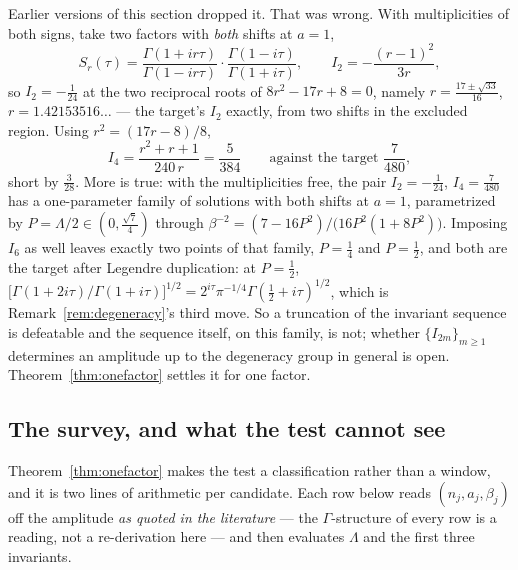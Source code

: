 \begin{remark}\label{rem:retraction}
Earlier versions of this section dropped it. That was wrong. With multiplicities
of both signs, take two factors with \emph{both} shifts at $a=1$,
\[
 S_r(\tau)=\frac{\Gamma(1+ir\tau)}{\Gamma(1-ir\tau)}\cdot
 \frac{\Gamma(1-i\tau)}{\Gamma(1+i\tau)},\qquad
 I_2=-\frac{(r-1)^2}{3r},
\]
so $I_2=-\frac1{24}$ at the two reciprocal roots of $8r^2-17r+8=0$, namely
$r=\frac{17\pm\sqrt{33}}{16}$, $r=1.42153516\ldots$ --- the target's $I_2$
exactly, from two shifts in the excluded region. Using $r^2=(17r-8)/8$,
\[
 I_4=\frac{r^2+r+1}{240\,r}=\frac5{384}
 \qquad\text{against the target }\frac7{480},
\]
short by $\frac3{28}$. More is true: with the multiplicities free, the pair
$I_2=-\frac1{24}$, $I_4=\frac7{480}$ has a one-parameter family of solutions with
both shifts at $a=1$, parametrized by $P=\Lambda/2\in(0,\frac{\sqrt7}4)$ through
$\beta^{-2}=(7-16P^2)/\big(16P^2(1+8P^2)\big)$. Imposing $I_6$ as well leaves
exactly two points of that family, $P=\frac14$ and $P=\frac12$, and both are the
target after Legendre duplication: at $P=\frac12$,
$\big[\Gamma(1+2i\tau)/\Gamma(1+i\tau)\big]^{1/2}
 =2^{i\tau}\pi^{-1/4}\Gamma(\frac12+i\tau)^{1/2}$, which is
Remark~\ref{rem:degeneracy}'s third move. So a truncation of the invariant
sequence is defeatable and the sequence itself, on this family, is not; whether
$\{I_{2m}\}_{m\geq1}$ determines an amplitude up to the degeneracy group in
general is open. Theorem~\ref{thm:onefactor} settles it for one factor.
\end{remark}

\subsection{The survey, and what the test cannot see}\label{ssec:survey}

Theorem~\ref{thm:onefactor} makes the test a classification rather than a window,
and it is two lines of arithmetic per candidate. Each row below reads
$(n_j,a_j,\beta_j)$ off the amplitude \emph{as quoted in the literature} --- the
$\Gamma$-structure of every row is a reading, not a re-derivation here --- and
then evaluates $\Lambda$ and the first three invariants.

